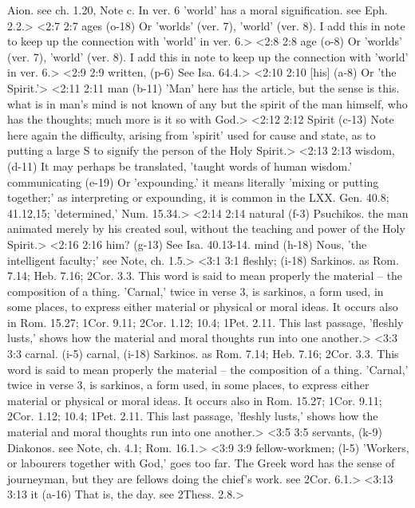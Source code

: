  Aion. see ch. 1.20, Note c. In ver. 6 'world' has a moral  signification. see Eph. 2.2.>
<2:7 2:7  ages (o-18)  Or 'worlds' (ver. 7), 'world' (ver. 8). I add this in note to  keep up the connection with 'world' in ver. 6.>
<2:8 2:8  age (o-8)  Or 'worlds' (ver. 7), 'world' (ver. 8). I add this in note to  keep up the connection with 'world' in ver. 6.>
<2:9 2:9  written, (p-6)  See Isa. 64.4.>
<2:10 2:10  [his] (a-8)  Or 'the Spirit.'>
<2:11 2:11  man (b-11)  'Man' here has the article, but the sense is this. what is in  man's mind is not known of any but the spirit of the man  himself, who has the thoughts; much more is it so with God.>
<2:12 2:12  Spirit (c-13)  Note here again the difficulty, arising from 'spirit' used  for cause and state, as to putting a large S to signify the  person of the Holy Spirit.>
<2:13 2:13  wisdom, (d-11)  It may perhaps be translated, 'taught words of human wisdom.'
  communicating (e-19)  Or 'expounding.' it means literally 'mixing or putting  together;' as interpreting or expounding, it is common in the  LXX. Gen. 40.8; 41.12,15; 'determined,' Num. 15.34.>
<2:14 2:14  natural (f-3)  Psuchikos. the man animated merely by his created soul,  without the teaching and power of the Holy Spirit.>
<2:16 2:16  him? (g-13)  See Isa. 40.13-14.
  mind (h-18)  Nous, 'the intelligent faculty;' see Note, ch. 1.5.>
<3:1 3:1  fleshly; (i-18)  Sarkinos. as Rom. 7.14; Heb. 7.16; 2Cor. 3.3. This word is  said to mean properly the material -- the composition of a  thing. 'Carnal,' twice in verse 3, is sarkinos, a form used,  in some places, to express either material or physical or moral  ideas. It occurs also in Rom. 15.27; 1Cor. 9.11; 2Cor. 1.12; 10.4; 1Pet. 2.11.  This last passage, 'fleshly lusts,' shows how  the material and moral thoughts run into one another.>
<3:3 3:3  carnal. (i-5)  carnal, (i-18)
  Sarkinos. as Rom. 7.14; Heb. 7.16; 2Cor. 3.3. This word is  said to mean properly the material -- the composition of a  thing. 'Carnal,' twice in verse 3, is sarkinos, a form used,  in some places, to express either material or physical or moral  ideas. It occurs also in Rom. 15.27; 1Cor. 9.11; 2Cor. 1.12; 10.4; 1Pet. 2.11.  This last passage, 'fleshly lusts,' shows how  the material and moral thoughts run into one another.>
<3:5 3:5  servants, (k-9)  Diakonos. see Note, ch. 4.1; Rom. 16.1.>
<3:9 3:9  fellow-workmen; (l-5)  'Workers, or labourers together with God,' goes too far.  The Greek word has the sense of journeyman, but they are  fellows doing the chief's work. see 2Cor. 6.1.>
<3:13 3:13  it (a-16)  That is, the day. see 2Thess. 2.8.>
